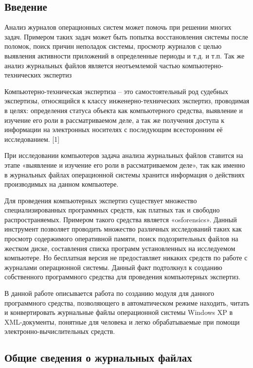 \subsection{Введение}

Анализ журналов операционных систем может помочь при решении многих задач. Примером таких задач может быть попытка восстановления системы после поломок, поиск причин неполадок системы, просмотр журналов с целью выявления активности приложений в определенные периоды и т.д. и т.п. Так же анализ журнальных файлов является неотъемлемой частью компьютерно-технических экспертиз 

Компьютерно-техническая экспертиза – это самостоятельный род судебных экспертизы, относящийся к классу инженерно-технических экспертиз, проводимая в целях: определения статуса объекта как компьютерного средства, выявление и изучение его роли в рассматриваемом деле, а так же получения доступа к информации на электронных носителях с последующим всесторонним её исследованием. [1] 

При исследовании компьютеров задача анализа журнальных файлов ставится на этапе «выявление и изучение его роли в рассматриваемом деле», так как именно в журнальных файлах операционной системы хранится информация о действиях производимых на данном компьютере. 

Для проведения компьютерных экспертиз существует множество специализированных программных средств, как платных так и свободно распространяемых. Примером такого средства является «osforensics». Данный инструмент позволяет проводить множество различных исследований таких как просмотр содержимого оперативной памяти, поиск подозрительных файлов на жестком диске, составления списка программ установленных на исследуемом компьютере. Но бесплатная версия не предоставляет никаких средств по работе с журналами операционной системы. Данный факт подтолкнул к созданию собственного программного средства для проведения компьютерных экспертиз.

В данной работе описывается работа по созданию модуля для данного программного средства, позволяющего в автоматическом режиме находить, читать и конвертировать журнальные файлы операционной системы Windows XP в XML-документы, понятные для человека и легко обрабатываемые при помощи электронно-вычислительных средств.

\subsection{Общие сведения о журнальных файлах}

